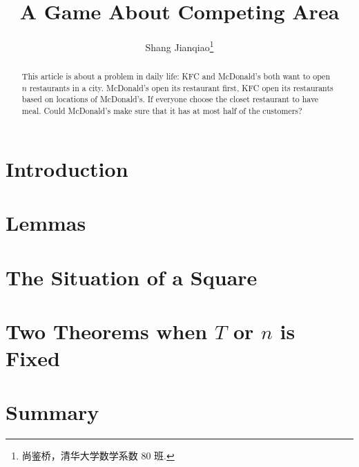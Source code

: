 \documentclass[twoside]{article}
\begin{document}
\title{A Game About Competing Area}
\author{Shang Jianqiao\footnote{尚鉴桥，清华大学数学系数 80 班.}}

\begin{abstract}
	This article is about a problem in daily life: KFC and McDonald's both want to open $n$ restaurants in a city. McDonald's open its restaurant first, KFC open its restaurants based on locations of McDonald's. If everyone choose the closet restaurant to have meal. Could McDonald's make sure that it has at most half of the customers?
\end{abstract}

\tableofcontents
\bigskip



\section{Introduction}



\section{Lemmas}



\section{The Situation of a Square}



\section{Two Theorems when \texorpdfstring{$T$}{T} or \texorpdfstring{$n$}{n} is Fixed}



\section{Summary}


\end{document}
